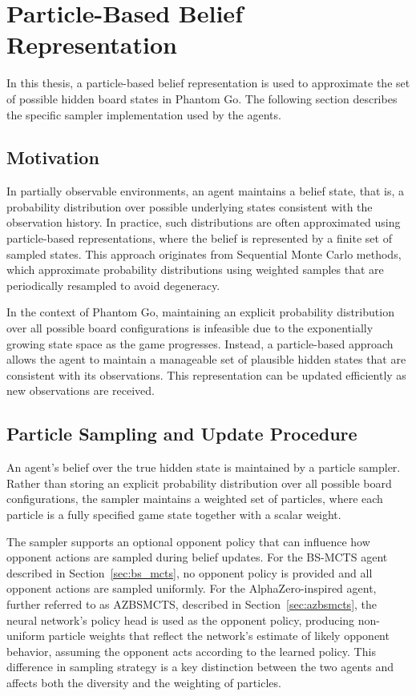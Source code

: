 \documentclass[12pt,oneside,openright]{article}
\begin{document}
\section{Particle-Based Belief Representation}
\label{sec:particle_sampler}

In this thesis, a particle-based belief representation is used to approximate the set of possible hidden board states in Phantom Go. The following section describes the specific sampler implementation used by the agents.

\subsection{Motivation}

In partially observable environments, an agent maintains a belief state, that is, a probability distribution over possible underlying states consistent with the observation history\cite{Veness2010pomdps}.
In practice, such distributions are often approximated using particle-based representations, where the belief is represented by a finite set of sampled states. This approach originates from Sequential Monte Carlo methods, which approximate probability distributions using weighted samples that are periodically resampled to avoid degeneracy\cite{Doucet2007particle}.

In the context of Phantom Go, maintaining an explicit probability distribution over all possible board configurations is infeasible due to the exponentially growing state space as the game progresses.
Instead, a particle-based approach allows the agent to maintain a manageable set of plausible hidden states that are consistent with its observations. This representation can be updated efficiently as new observations are received.


\subsection{Particle Sampling and Update Procedure}

An agent's belief over the true hidden state is maintained by a particle sampler.
Rather than storing an explicit probability distribution over all possible board configurations, the sampler maintains a weighted set of particles, where each particle is a fully specified game state together with a scalar weight.

The sampler supports an optional opponent policy that can influence how opponent actions are sampled during belief updates.
For the BS-MCTS agent described in Section~\ref{sec:bs_mcts}, no opponent policy is provided and all opponent actions are sampled uniformly.
For the AlphaZero-inspired agent, further referred to as AZBSMCTS, described in Section~\ref{sec:azbsmcts}, the neural network's policy head is used as the opponent policy, producing non-uniform particle weights that reflect the network's estimate of likely opponent behavior, assuming the opponent acts according to the learned policy. This difference in sampling strategy is a key distinction between the two agents and affects both the diversity and the weighting of particles.
\end{document}
